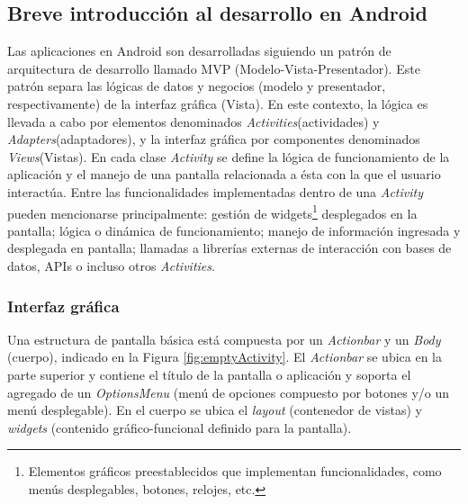     \subsection{Breve introducción al desarrollo en Android}
    
    \par Las aplicaciones en Android son desarrolladas siguiendo un patrón de arquitectura de desarrollo llamado MVP (Modelo-Vista-Presentador). Este patrón separa las lógicas de datos y negocios (modelo y presentador, respectivamente) de la interfaz gráfica (Vista). En este contexto, la lógica es llevada a cabo por elementos denominados \textit{Activities}(actividades) y \textit{Adapters}(adaptadores), y la interfaz gráfica por componentes denominados \textit{Views}(Vistas). En cada clase \textit{\gls{Activity}} se define la lógica de funcionamiento de la aplicación y el manejo de una pantalla relacionada a ésta con la que el usuario interactúa. Entre las funcionalidades implementadas dentro de una \textit{Activity} pueden mencionarse principalmente: gestión de widgets\footnote{Elementos gráficos preestablecidos que implementan funcionalidades, como menús desplegables, botones, relojes, etc.} desplegados en la pantalla; lógica o dinámica de funcionamiento; manejo de información ingresada y desplegada en pantalla; llamadas a librerías externas de interacción con bases de datos, APIs o incluso otros \textit{Activities}.
    
    \subsubsection{Interfaz gráfica}
    \label{explicacionInterfazGrafica}
    
    \par Una estructura de pantalla básica está compuesta por un \textit{Actionbar} y un \textit{Body} (cuerpo), indicado en la Figura \ref{fig:emptyActivity}. El \textit{Actionbar} se ubica en la parte superior y contiene el título de la pantalla o aplicación y soporta el agregado de un \textit{OptionsMenu} (menú de opciones compuesto por botones y/o un menú desplegable). En el cuerpo se ubica el \textit{layout} (contenedor de vistas) y \textit{widgets} (contenido gráfico-funcional definido para la pantalla).
    
